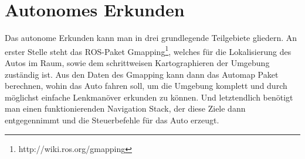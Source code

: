\documentclass{article}
\begin{document}
\section{Autonomes Erkunden}
\label{subsec:autonomeserkunden}
Das autonome Erkunden kann man in drei grundlegende Teilgebiete gliedern. An erster Stelle steht das ROS-Paket Gmapping\footnote{http://wiki.ros.org/gmapping}, welches für die Lokalisierung des Autos im Raum, sowie dem schrittweisen Kartographieren der Umgebung zuständig ist. Aus den Daten des Gmapping kann dann das Automap Paket berechnen, wohin das Auto fahren soll, um die Umgebung komplett und durch möglichst einfache Lenkmanöver erkunden zu können. Und letztendlich benötigt man einen funktionierenden Navigation Stack, der diese Ziele dann entgegennimmt und die Steuerbefehle für das Auto erzeugt. 
\end{document}
